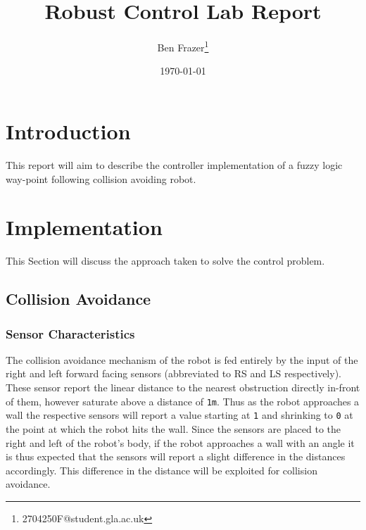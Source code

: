 \documentclass[11pt]{article}
\author{Ben Frazer\thanks{2704250F@student.gla.ac.uk}}
\date{\today}
\title{Robust Control Lab Report}
\numberwithin{equation}{section}
\begin{document}
\maketitle
{}


\section{Introduction}
\label{sec:org4709ac2}
This report will aim to describe the controller implementation of a fuzzy logic way-point following collision avoiding robot.

\section{Implementation}
\label{sec:orgd40fb1b}
This Section will discuss the approach taken to solve the control problem.

\subsection{Collision Avoidance \label{sectCollisionAvoidance}}
\label{sec:org6a65e5d}
\subsubsection{Sensor Characteristics}
\label{sec:orgb5deb3e}
The collision avoidance mechanism of the robot is fed entirely by the input of the right and left forward facing sensors (abbreviated to RS and LS respectively). These sensor report the linear distance to the nearest obstruction directly in-front of them, however saturate above a distance of \texttt{1m}. Thus as  the robot approaches a wall the respective sensors will report a value starting at \texttt{1} and shrinking to \texttt{0} at the point at which the robot hits the wall. Since the sensors are placed to the right and left of the robot's body, if the robot approaches a wall with an angle it is thus expected that the sensors will report a slight difference in the distances accordingly. This difference in the distance will be exploited for collision avoidance.
\end{document}
